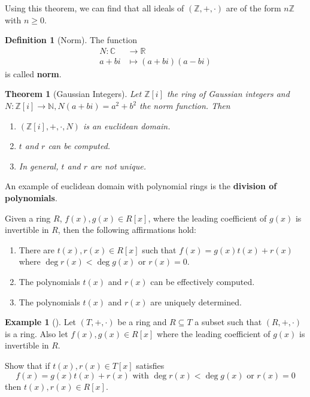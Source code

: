 \documentclass[12pt,a4paper]{article}
\newtheorem{theorem}{Theorem}[section]
\theoremstyle{definition}
\newtheorem{example}{Example}[section]
\newtheorem{definition}{Definition}[section]
\begin{document}
Using this theorem, we can find that all ideals of $(\mathbb{Z},+,\cdot)$ are of the form $n \mathbb{Z}$ with $n \geq 0$.

\begin{definition}[Norm]
The function
\begin{equation*}
\begin{aligned}
N : \mathbb{C} & \to \mathbb{R} \\
a+bi & \mapsto (a+bi)(a-bi)
\end{aligned}
\end{equation*}
is called \textbf{norm}.
\end{definition}

\begin{theorem}[Gaussian Integers]
Let $\mathbb{Z}[i]$ the ring of Gaussian integers and $N : \mathbb{Z}[i] \to \mathbb{N}, N(a+bi) = a^2+b^2$ the norm function. Then
\begin{enumerate}
\item $(\mathbb{Z}[i],+,\cdot,N)$ is an euclidean domain.
\item $t$ and $r$ can be computed.
\item In general, $t$ and $r$ are not unique.
\end{enumerate}
\end{theorem}

An example of euclidean domain with polynomial rings is the \textbf{division of polynomials}.

Given a ring $R$, $f(x), g(x) \in R[x]$, where the leading coefficient of $g(x)$ is invertible in $R$, then the following affirmations hold:
\begin{enumerate}
\item There are $t(x), r(x) \in R[x]$ such that $f(x) = g(x)t(x) + r(x)$ where $\deg r(x) < \deg g(x)$ or $r(x) = 0$.
\item The polynomials $t(x)$ and $r(x)$ can be effectively computed.
\item The polynomials $t(x)$ and $r(x)$ are uniquely determined.
\end{enumerate}

\begin{example}[]
Let $(T,+,\cdot)$ be a ring and $R \subseteq T$ a subset such that $(R,+,\cdot)$ is a ring. Also let $f(x), g(x) \in R[x]$ where the leading coefficient of $g(x)$ is invertible in $R$.

Show that if $t(x), r(x) \in T[x]$ satisfies
\[
f(x) = g(x) t(x) + r(x) \text{ with } \deg r(x) < \deg g(x) \text{ or } r(x) = 0
\]
then $t(x), r(x) \in R[x]$.
\end{example}
\end{document}
